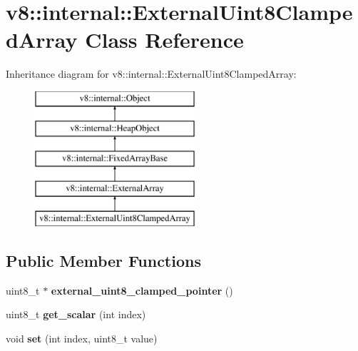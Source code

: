 \hypertarget{classv8_1_1internal_1_1_external_uint8_clamped_array}{}\section{v8\+:\+:internal\+:\+:External\+Uint8\+Clamped\+Array Class Reference}
\label{classv8_1_1internal_1_1_external_uint8_clamped_array}
Inheritance diagram for v8\+:\+:internal\+:\+:External\+Uint8\+Clamped\+Array\+:\begin{figure}[H]
\begin{center}
\leavevmode
\includegraphics[height=5.000000cm]{classv8_1_1internal_1_1_external_uint8_clamped_array}
\end{center}
\end{figure}
\subsection*{Public Member Functions}
\begin{DoxyCompactItemize}
\item 
\hypertarget{classv8_1_1internal_1_1_external_uint8_clamped_array_a1ddba30744b8a04de60d765b83094cd9}{}uint8\+\_\+t $\ast$ {\bfseries external\+\_\+uint8\+\_\+clamped\+\_\+pointer} ()\label{classv8_1_1internal_1_1_external_uint8_clamped_array_a1ddba30744b8a04de60d765b83094cd9}

\item 
\hypertarget{classv8_1_1internal_1_1_external_uint8_clamped_array_aeedb0c96950989858f2966cab27440c3}{}uint8\+\_\+t {\bfseries get\+\_\+scalar} (int index)\label{classv8_1_1internal_1_1_external_uint8_clamped_array_aeedb0c96950989858f2966cab27440c3}

\item 
\hypertarget{classv8_1_1internal_1_1_external_uint8_clamped_array_aeebebec94512a743620031808e7a86f3}{}void {\bfseries set} (int index, uint8\+\_\+t value)\label{classv8_1_1internal_1_1_external_uint8_clamped_array_aeebebec94512a743620031808e7a86f3}

\end{DoxyCompactItemize}
